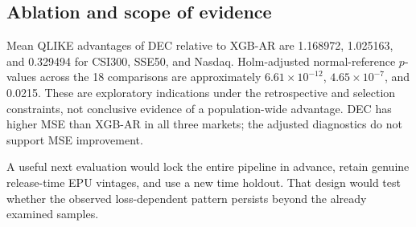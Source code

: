 \subsection{Ablation and scope of evidence}
Mean QLIKE advantages of DEC relative to XGB-AR are 1.168972, 1.025163, and 0.329494 for CSI300, SSE50, and Nasdaq. Holm-adjusted normal-reference $p$-values across the 18 comparisons are approximately $6.61\times10^{-12}$, $4.65\times10^{-7}$, and 0.0215. These are exploratory indications under the retrospective and selection constraints, not conclusive evidence of a population-wide advantage. DEC has higher MSE than XGB-AR in all three markets; the adjusted diagnostics do not support MSE improvement.

A useful next evaluation would lock the entire pipeline in advance, retain genuine release-time EPU vintages, and use a new time holdout. That design would test whether the observed loss-dependent pattern persists beyond the already examined samples.
\clearpage
